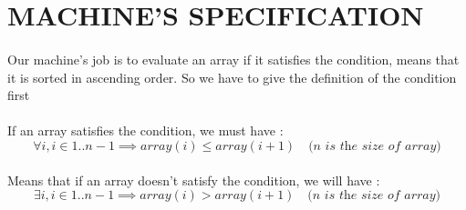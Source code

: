 \section{MACHINE'S SPECIFICATION}

\paragraph{}
Our machine's job is to evaluate an array if it satisfies the condition, means that it is sorted in ascending order.  So we have to give the definition of the condition first

\paragraph{}
If an array satisfies the condition, we must have :
$$ \forall i, i \in 1..n-1 \implies array(i) \leq array(i+1) \quad \textit{(n is the size of array)}$$

\paragraph{}
Means that if an array doesn't satisfy the condition, we will have :
$$ \exists i, i \in 1..n-1 \implies array(i) > array(i+1) \quad \textit{(n is the size of array)} $$

